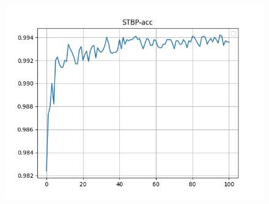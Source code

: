 \documentclass{beamer}
\begin{document}
\begin{frame}
    \begin{figure}[l]
        \centering
        \includegraphics[height=.9\textheight]{pic/STBP-acc.png}
    \end{figure}
\end{frame}


\end{document}
